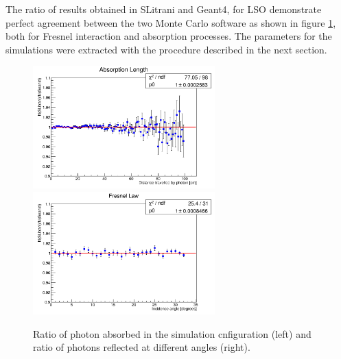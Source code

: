 The ratio of results obtained in SLitrani and Geant4, for LSO demonstrate perfect agreement between the two Monte Carlo software as shown in figure \ref{fig:abs}, both for Fresnel interaction and absorption processes. The parameters for the simulations were extracted with the procedure described in the next section.
\begin{figure}[htbp]
\begin{center}
\includegraphics[width=7cm]{../Pictures/Chapter_5/abs.png}
\includegraphics[width=7cm]{../Pictures/Chapter_5/fresnel.png}
\end{center}
\caption[Geant4 SLitrani absorption and reflection]{Ratio of photon absorbed in the simulation cnfiguration (left) and ratio of photons reflected at different angles (right).}
\label{fig:abs}
\end{figure}

